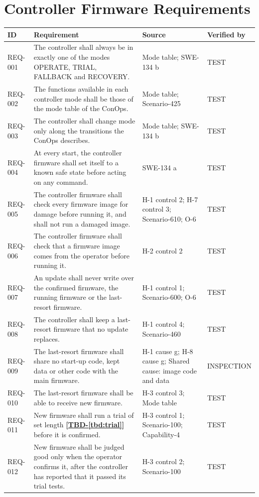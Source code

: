 \documentclass[11pt,a4paper]{article}
\newcommand{\tbd}[1]{\mbox{\textbf{[\hyperref[tbd:#1]{TBD-\ref*{tbd:#1}}]}}}
\begin{document}
\section{Controller Firmware Requirements}
{\footnotesize
\begin{xltabular}{\textwidth}{@{}l>{\raggedright\arraybackslash}X>{\raggedright\arraybackslash}p{3.2cm}>{\raggedright\arraybackslash}p{3.0cm}@{}}
\toprule
ID & Requirement & Source & Verified by \\
\midrule
\endhead
REQ-001 & The controller shall always be in exactly one of the modes OPERATE, TRIAL, FALLBACK and RECOVERY. & Mode table; SWE-134 b & TEST \\
REQ-002 & The functions available in each controller mode shall be those of the mode table of the ConOps. & Mode table; Scenario-425 & TEST \\
REQ-003 & The controller shall change mode only along the transitions the ConOps describes. & Mode table; SWE-134 b & TEST \\
REQ-004 & At every start, the controller firmware shall set itself to a known safe state before acting on any command. & SWE-134 a & TEST \\
REQ-005 & The controller firmware shall check every firmware image for damage before running it, and shall not run a damaged image. & H-1 control 2; H-7 control 3; Scenario-610; O-6 & TEST \\
REQ-006 & The controller firmware shall check that a firmware image comes from the operator before running it. & H-2 control 2 & TEST \\
REQ-007 & An update shall never write over the confirmed firmware, the running firmware or the last-resort firmware. & H-1 control 1; Scenario-600; O-6 & TEST \\
REQ-008 & The controller shall keep a last-resort firmware that no update replaces. & H-1 control 4; Scenario-460 & TEST \\
REQ-009 & The last-resort firmware shall share no start-up code, kept data or other code with the main firmware. & H-1 cause g; H-8 cause g; Shared cause: image code and data & INSPECTION \\
REQ-010 & The last-resort firmware shall be able to receive new firmware. & H-3 control 3; Mode table & TEST \\
REQ-011 & New firmware shall run a trial of set length \tbd{trial} before it is confirmed. & H-3 control 1; Scenario-100; Capability-4 & TEST \\
REQ-012 & New firmware shall be judged good only when the operator confirms it, after the controller has reported that it passed its trial tests. & H-3 control 2; Scenario-100 & TEST \\

\end{xltabular}}
\end{document}
